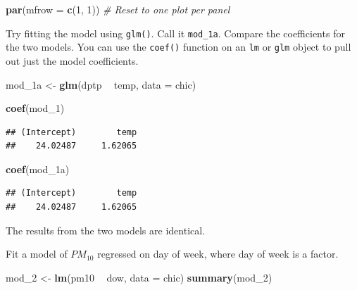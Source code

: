 \documentclass[]{book}
\makeatletter
\newenvironment{Shaded}{\begin{snugshade}}{\end{snugshade}}
\newcommand{\KeywordTok}[1]{\textcolor[rgb]{0.13,0.29,0.53}{\textbf{#1}}}
\newcommand{\DataTypeTok}[1]{\textcolor[rgb]{0.13,0.29,0.53}{#1}}
\newcommand{\DecValTok}[1]{\textcolor[rgb]{0.00,0.00,0.81}{#1}}
\newcommand{\StringTok}[1]{\textcolor[rgb]{0.31,0.60,0.02}{#1}}
\newcommand{\CommentTok}[1]{\textcolor[rgb]{0.56,0.35,0.01}{\textit{#1}}}
\newcommand{\OperatorTok}[1]{\textcolor[rgb]{0.81,0.36,0.00}{\textbf{#1}}}
\newcommand{\NormalTok}[1]{#1}
\newenvironment{kframe}{%
\medskip{}
\setlength{\fboxsep}{.8em}
 \def\at@end@of@kframe{}%
 \ifinner\ifhmode%
  \def\at@end@of@kframe{\end{minipage}}%
  \begin{minipage}{\columnwidth}%
 \fi\fi%
 \def\FrameCommand##1{\hskip\@totalleftmargin \hskip-\fboxsep
 \colorbox{shadecolor}{##1}\hskip-\fboxsep
     \hskip-\linewidth \hskip-\@totalleftmargin \hskip\columnwidth}%
 \MakeFramed {\advance\hsize-\width
   \@totalleftmargin\z@ \linewidth\hsize
   \@setminipage}}%
 {\par\unskip\endMakeFramed%
 \at@end@of@kframe}
\renewenvironment{Shaded}{\begin{kframe}}{\end{kframe}}
\theoremstyle{definition}
\theoremstyle{definition}
\theoremstyle{definition}
\theoremstyle{remark}
\makeatother
\begin{document}
\begin{Shaded}
\begin{Highlighting}[]
\KeywordTok{par}\NormalTok{(}\DataTypeTok{mfrow =} \KeywordTok{c}\NormalTok{(}\DecValTok{1}\NormalTok{, }\DecValTok{1}\NormalTok{)) }\CommentTok{# Reset to one plot per panel}
\end{Highlighting}
\end{Shaded}

Try fitting the model using \texttt{glm()}. Call it \texttt{mod\_1a}.
Compare the coefficients for the two models. You can use the
\texttt{coef()} function on an \texttt{lm} or \texttt{glm} object to
pull out just the model coefficients.

\begin{Shaded}
\begin{Highlighting}[]
\NormalTok{mod_1a <-}\StringTok{ }\KeywordTok{glm}\NormalTok{(dptp }\OperatorTok{~}\StringTok{ }\NormalTok{temp, }\DataTypeTok{data =}\NormalTok{ chic)}

\KeywordTok{coef}\NormalTok{(mod_}\DecValTok{1}\NormalTok{)}
\end{Highlighting}
\end{Shaded}

\begin{verbatim}
## (Intercept)        temp 
##    24.02487     1.62065
\end{verbatim}

\begin{Shaded}
\begin{Highlighting}[]
\KeywordTok{coef}\NormalTok{(mod_1a)}
\end{Highlighting}
\end{Shaded}

\begin{verbatim}
## (Intercept)        temp 
##    24.02487     1.62065
\end{verbatim}

The results from the two models are identical.

Fit a model of \(PM_{10}\) regressed on day of week, where day of week
is a factor.

\begin{Shaded}
\begin{Highlighting}[]
\NormalTok{mod_}\DecValTok{2}\NormalTok{ <-}\StringTok{ }\KeywordTok{lm}\NormalTok{(pm10 }\OperatorTok{~}\StringTok{ }\NormalTok{dow, }\DataTypeTok{data =}\NormalTok{ chic)}
\KeywordTok{summary}\NormalTok{(mod_}\DecValTok{2}\NormalTok{)}
\end{Highlighting}
\end{Shaded}
\end{document}
